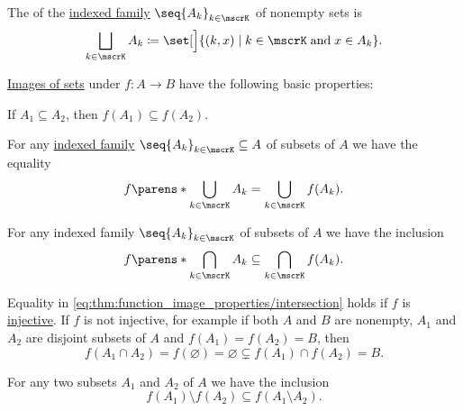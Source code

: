 \begin{definition}\label{def:disjoint_union}
  The  of the \hyperref[def:indexed_family]{indexed family} \( \seq{ A_k }_{k \in \mscrK} \) of nonempty sets is
  \begin{equation*}
    \bigsqcup_{k \in \mscrK} A_k \coloneqq \set[\Big]{ (k, x) \given k \in \mscrK \T{and} x \in A_k }.
  \end{equation*}
\end{definition}

\begin{proposition}\label{thm:function_image_properties}
  \hyperref[def:multi_valued_function/set_value]{Images of sets} under \( f: A \to B \) have the following basic properties:
  \begin{thmenum}
     If \( A_1 \subseteq A_2 \), then \( f(A_1) \subseteq f(A_2) \).

     For any \hyperref[def:indexed_family]{indexed family} \( \seq{ A_k }_{k \in \mscrK} \subseteq A \) of subsets of \( A \) we have the equality
    \begin{equation}\label{eq:thm:function_image_properties/union}
      f\parens*{ \bigcup_{k \in \mscrK} A_k } = \bigcup_{k \in \mscrK} f(A_k).
    \end{equation}

     For any indexed family \( \seq{ A_k }_{k \in \mscrK} \) of subsets of \( A \) we have the inclusion
    \begin{equation}\label{eq:thm:function_image_properties/intersection}
      f\parens*{ \bigcap_{k \in \mscrK} A_k } \subseteq \bigcap_{k \in \mscrK} f(A_k).
    \end{equation}

    Equality in \eqref{eq:thm:function_image_properties/intersection} holds if \( f \) is \hyperref[def:function_invertibility/injective]{injective}. If \( f \) is not injective, for example if both \( A \) and \( B \) are nonempty, \( A_1 \) and \( A_2 \) are disjoint subsets of \( A \) and \( f(A_1) = f(A_2) = B \), then
    \begin{equation*}
      f(A_1 \cap A_2) = f(\varnothing) = \varnothing \subsetneq f(A_1) \cap f(A_2) = B.
    \end{equation*}

     For any two subsets \( A_1 \) and \( A_2 \) of \( A \) we have the inclusion
    \begin{equation}\label{eq:thm:function_image_properties/difference}
      f(A_1) \setminus f(A_2) \subseteq f(A_1 \setminus A_2).
    \end{equation}


\end{thmenum}
\end{proposition}
